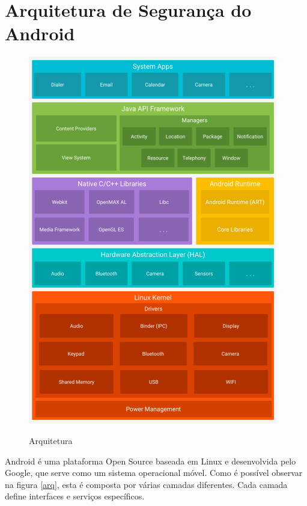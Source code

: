 




\newpage
\section{Arquitetura de Segurança do Android}
\begin{figure}[h!]
\centering
\includegraphics[scale=0.6]{arquiteturaAndroid.png}
\label{fig:arq}
\caption{Arquitetura}
\end{figure}

Android é uma plataforma Open Source baseada em Linux e desenvolvida pelo Google, que serve como um sistema operacional móvel.
Como é possível observar na figura \ref{arq}, esta é composta por várias camadas diferentes. Cada camada define interfaces e serviços específicos.


